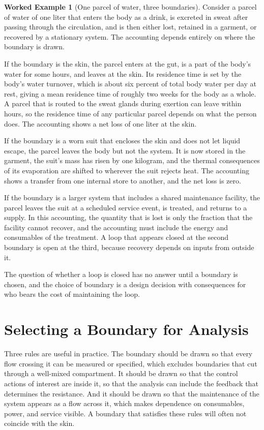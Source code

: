 \documentclass[11pt,openany]{book}
\theoremstyle{definition}
\newtheorem{example}{Worked Example}[chapter]
\theoremstyle{remark}
\begin{document}
\begin{example}[One parcel of water, three boundaries]
\label{ex:parcel}
Consider a parcel of water of one liter that enters the body as a drink, is excreted in sweat after passing through the circulation, and is then either lost, retained in a garment, or recovered by a stationary system. The accounting depends entirely on where the boundary is drawn.

If the boundary is the skin, the parcel enters at the gut, is a part of the body's water for some hours, and leaves at the skin. Its residence time is set by the body's water turnover, which is about six percent of total body water per day at rest, giving a mean residence time of roughly two weeks for the body as a whole. A parcel that is routed to the sweat glands during exertion can leave within hours, so the residence time of any particular parcel depends on what the person does. The accounting shows a net loss of one liter at the skin.

If the boundary is a worn suit that encloses the skin and does not let liquid escape, the parcel leaves the body but not the system. It is now stored in the garment, the suit's mass has risen by one kilogram, and the thermal consequences of its evaporation are shifted to wherever the suit rejects heat. The accounting shows a transfer from one internal store to another, and the net loss is zero.

If the boundary is a larger system that includes a shared maintenance facility, the parcel leaves the suit at a scheduled service event, is treated, and returns to a supply. In this accounting, the quantity that is lost is only the fraction that the facility cannot recover, and the accounting must include the energy and consumables of the treatment. A loop that appears closed at the second boundary is open at the third, because recovery depends on inputs from outside it.
\end{example}

The question of whether a loop is closed has no answer until a boundary is chosen, and the choice of boundary is a design decision with consequences for who bears the cost of maintaining the loop.

\section{Selecting a Boundary for Analysis}

Three rules are useful in practice. The boundary should be drawn so that every flow crossing it can be measured or specified, which excludes boundaries that cut through a well-mixed compartment. It should be drawn so that the control actions of interest are inside it, so that the analysis can include the feedback that determines the resistance. And it should be drawn so that the maintenance of the system appears as a flow across it, which makes dependence on consumables, power, and service visible. A boundary that satisfies these rules will often not coincide with the skin.
\end{document}
